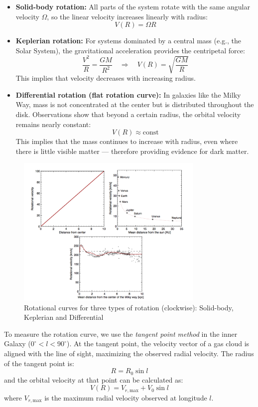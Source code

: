 \documentclass[12pt,a4paper]{article}
\begin{document}
\begin{itemize}
  \item \textbf{Solid-body rotation:} All parts of the system rotate with the same angular \\ velocity $\Omega$, so the linear velocity increases linearly with radius:
  \[
  V(R) = \Omega R
  \]
  
  \item \textbf{Keplerian rotation:} For systems dominated by a central mass (e.g., the Solar System), the gravitational acceleration provides the centripetal force:
  \[
  \frac{V^2}{R} = \frac{GM}{R^2} \quad \Rightarrow \quad V(R) = \sqrt{\frac{GM}{R}}
  \]
  This implies that velocity decreases with increasing radius.

  \item \textbf{Differential rotation (flat rotation curve):} In galaxies like the Milky Way, mass is not concentrated at the center but is distributed throughout the disk. Observations show that beyond a certain radius, the orbital velocity remains nearly constant:
  \[
  V(R) \approx \text{const}
  \]
  This implies that the mass continues to increase with radius, even where there is little visible matter — therefore providing evidence for dark matter.
\end{itemize}
\begin{figure}[H]
  \centering
  \includegraphics[width=0.8\textwidth]{Pictures/rotation.png}
  \caption{Rotational curves for three types of rotation (clockwise): Solid-body, Keplerian and Differential}
  \label{fig:rotation}
\end{figure}
To measure the rotation curve, we use the \emph{tangent point method} in the inner Galaxy ($0^\circ < l < 90^\circ$). At the tangent point, the velocity vector of a gas cloud is aligned with the line of sight, maximizing the observed radial velocity. The radius of the tangent point is:
\[
R = R_0 \sin l
\]
and the orbital velocity at that point can be calculated as:
\[
V(R) = V_{r,\text{max}} + V_0 \sin l
\]
where $V_{r,\text{max}}$ is the maximum radial velocity observed at longitude $l$.
\end{document}

